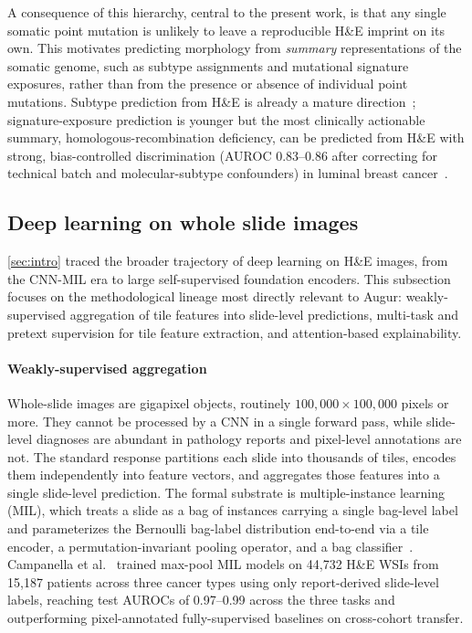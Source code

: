 A consequence of this hierarchy, central to the present work, is that any single somatic point mutation is unlikely to leave a reproducible H\&E imprint on its own. 
This motivates predicting morphology from \emph{summary} representations of the somatic genome, such as subtype assignments and mutational signature exposures, rather than from the presence or absence of individual point mutations.
Subtype prediction from H\&E is already a mature direction~\cite{coutureImageAnalysisDeep2018, jaberDeepLearningImagebased2020, sirinukunwattanaImagebasedConsensusMolecular2021, fremondInterpretableDeepLearning2023, volinsky-fremondPredictionRecurrenceRisk2024}; 
signature-exposure prediction is younger but the most clinically actionable summary, homologous-recombination deficiency, can be predicted from H\&E with strong, bias-controlled discrimination (AUROC 0.83--0.86 after correcting for technical batch and molecular-subtype confounders) in luminal breast cancer~\cite{lazardDeepLearningIdentifies2022}.

\subsection{Deep learning on whole slide images}\label{sec:related/dl-wsi}

\autoref{sec:intro} traced the broader trajectory of deep learning on H\&E images, from the CNN-MIL era to large self-supervised foundation encoders.
This subsection focuses on the methodological lineage most directly relevant to Augur: weakly-supervised aggregation of tile features into slide-level predictions, multi-task and pretext supervision for tile feature extraction, and attention-based explainability.

\paragraph{Weakly-supervised aggregation}
Whole-slide images are gigapixel objects, routinely $100{,}000 \times 100{,}000$ pixels or more. They cannot be processed by a CNN in a single forward pass, while slide-level diagnoses are abundant in pathology reports and pixel-level annotations are not.
The standard response partitions each slide into thousands of tiles, encodes them independently into feature vectors, and aggregates those features into a single slide-level prediction. The formal substrate is multiple-instance learning (MIL), which treats a slide as a bag of instances carrying a single bag-level label and parameterizes the Bernoulli bag-label distribution end-to-end via a tile encoder, a permutation-invariant pooling operator, and a bag classifier~\cite{ilseAttentionbasedDeepMultiple2018}.
Campanella et al.~\cite{campanellaClinicalgradeComputationalPathology2019} trained max-pool MIL models on 44{,}732 H\&E WSIs from 15{,}187 patients across three cancer types using only report-derived slide-level labels, reaching test AUROCs of 0.97--0.99 across the three tasks and outperforming pixel-annotated fully-supervised baselines on cross-cohort transfer.

